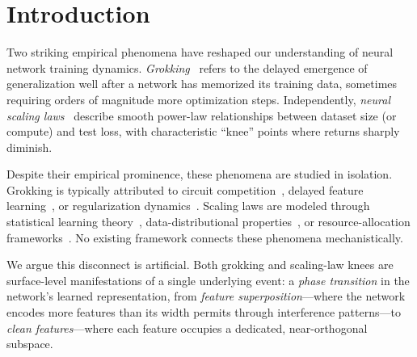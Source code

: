 \documentclass{article}
\begin{document}
\section{Introduction}
\label{sec:intro}

Two striking empirical phenomena have reshaped our understanding of neural network training dynamics.
\emph{Grokking}~\citep{power2022grokking} refers to the delayed emergence of generalization well after a network has memorized its training data, sometimes requiring orders of magnitude more optimization steps.
Independently, \emph{neural scaling laws}~\citep{kaplan2020scaling,hoffmann2022training} describe smooth power-law relationships between dataset size (or compute) and test loss, with characteristic ``knee'' points where returns sharply diminish.

Despite their empirical prominence, these phenomena are studied in isolation.
Grokking is typically attributed to circuit competition~\citep{nanda2023progress}, delayed feature learning~\citep{liu2023omnigrok}, or regularization dynamics~\citep{thilak2022slingshot}.
Scaling laws are modeled through statistical learning theory~\citep{bahri2024explaining}, data-distributional properties~\citep{caballero2023broken}, or resource-allocation frameworks~\citep{hoffmann2022training}.
No existing framework connects these phenomena mechanistically.

We argue this disconnect is artificial.
Both grokking and scaling-law knees are surface-level manifestations of a single underlying event: a \emph{phase transition} in the network's learned representation, from \emph{feature superposition}---where the network encodes more features than its width permits through interference patterns---to \emph{clean features}---where each feature occupies a dedicated, near-orthogonal subspace.
\end{document}
